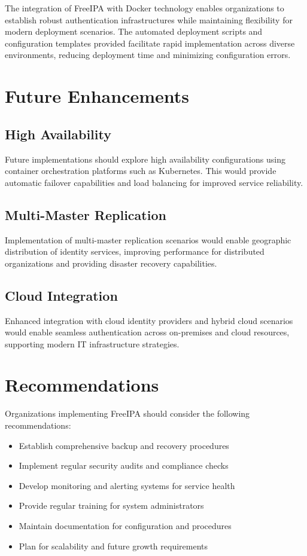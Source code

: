 \documentclass[12pt,a4paper]{report}
\begin{document}
The integration of FreeIPA with Docker technology enables organizations to establish robust authentication infrastructures while maintaining flexibility for modern deployment scenarios. The automated deployment scripts and configuration templates provided facilitate rapid implementation across diverse environments, reducing deployment time and minimizing configuration errors.

\section{Future Enhancements}

\subsection{High Availability}

Future implementations should explore high availability configurations using container orchestration platforms such as Kubernetes. This would provide automatic failover capabilities and load balancing for improved service reliability.

\subsection{Multi-Master Replication}

Implementation of multi-master replication scenarios would enable geographic distribution of identity services, improving performance for distributed organizations and providing disaster recovery capabilities.

\subsection{Cloud Integration}

Enhanced integration with cloud identity providers and hybrid cloud scenarios would enable seamless authentication across on-premises and cloud resources, supporting modern IT infrastructure strategies.

\section{Recommendations}

Organizations implementing FreeIPA should consider the following recommendations:

\begin{itemize}
    \item Establish comprehensive backup and recovery procedures
    \item Implement regular security audits and compliance checks
    \item Develop monitoring and alerting systems for service health
    \item Provide regular training for system administrators
    \item Maintain documentation for configuration and procedures
    \item Plan for scalability and future growth requirements
\end{itemize}
\end{document}
